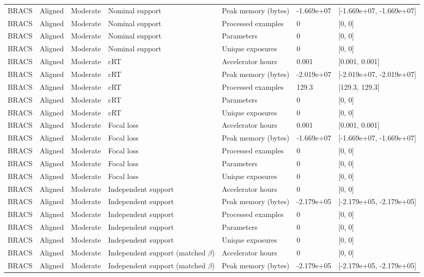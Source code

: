 \begin{longtable}{lllllll}
BRACS & Aligned & Moderate & Nominal support & Peak memory (bytes) & -1.669e+07 & [-1.669e+07, -1.669e+07] \\
BRACS & Aligned & Moderate & Nominal support & Processed examples & 0 & [0, 0] \\
BRACS & Aligned & Moderate & Nominal support & Parameters & 0 & [0, 0] \\
BRACS & Aligned & Moderate & Nominal support & Unique exposures & 0 & [0, 0] \\
BRACS & Aligned & Moderate & cRT & Accelerator hours & 0.001 & [0.001, 0.001] \\
BRACS & Aligned & Moderate & cRT & Peak memory (bytes) & -2.019e+07 & [-2.019e+07, -2.019e+07] \\
BRACS & Aligned & Moderate & cRT & Processed examples & 129.3 & [129.3, 129.3] \\
BRACS & Aligned & Moderate & cRT & Parameters & 0 & [0, 0] \\
BRACS & Aligned & Moderate & cRT & Unique exposures & 0 & [0, 0] \\
BRACS & Aligned & Moderate & Focal loss & Accelerator hours & 0.001 & [0.001, 0.001] \\
BRACS & Aligned & Moderate & Focal loss & Peak memory (bytes) & -1.669e+07 & [-1.669e+07, -1.669e+07] \\
BRACS & Aligned & Moderate & Focal loss & Processed examples & 0 & [0, 0] \\
BRACS & Aligned & Moderate & Focal loss & Parameters & 0 & [0, 0] \\
BRACS & Aligned & Moderate & Focal loss & Unique exposures & 0 & [0, 0] \\
BRACS & Aligned & Moderate & Independent support & Accelerator hours & 0 & [0, 0] \\
BRACS & Aligned & Moderate & Independent support & Peak memory (bytes) & -2.179e+05 & [-2.179e+05, -2.179e+05] \\
BRACS & Aligned & Moderate & Independent support & Processed examples & 0 & [0, 0] \\
BRACS & Aligned & Moderate & Independent support & Parameters & 0 & [0, 0] \\
BRACS & Aligned & Moderate & Independent support & Unique exposures & 0 & [0, 0] \\
BRACS & Aligned & Moderate & Independent support (matched $\beta$) & Accelerator hours & 0 & [0, 0] \\
BRACS & Aligned & Moderate & Independent support (matched $\beta$) & Peak memory (bytes) & -2.179e+05 & [-2.179e+05, -2.179e+05] \\

\end{longtable}
